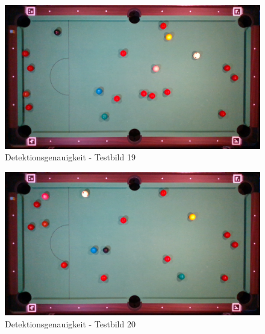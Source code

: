 \begin{figure}[h!]
    \begin{center}
        \includegraphics[width=0.8\linewidth]{../common/07_appendix/resources/00_detection/18_detektion_testbild_19.png}
    \end{center}
    \caption{Detektionsgenauigkeit - Testbild 19}
    \label{fig:detektionsgenauigkeit:testbild:19}
\end{figure}
\begin{figure}[h!]
    \begin{center}
        \includegraphics[width=0.8\linewidth]{../common/07_appendix/resources/00_detection/19_detektion_testbild_20.png}
    \end{center}
    \caption{Detektionsgenauigkeit - Testbild 20}
    \label{fig:detektionsgenauigkeit:testbild:20}
\end{figure}

